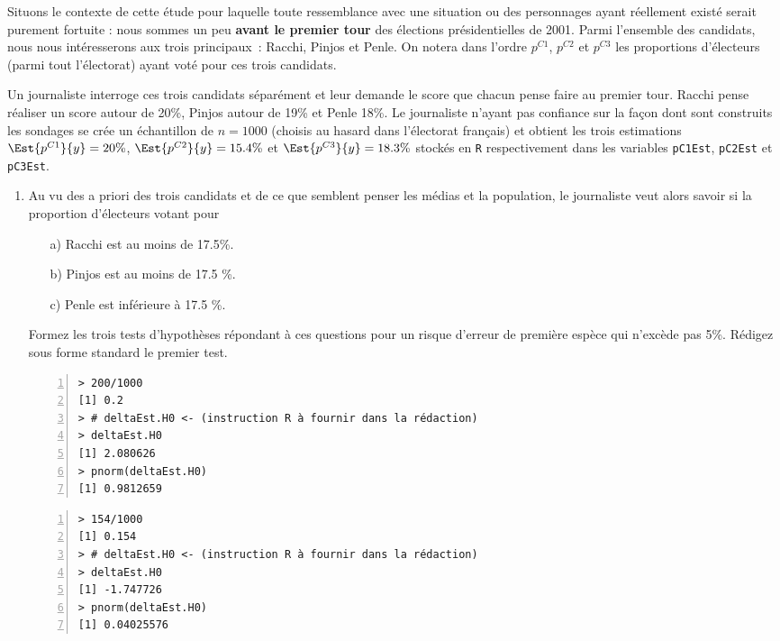 \documentclass[10pt]{report}
\begin{document}
\begin{exercice}

Situons le contexte  de cette étude pour laquelle toute ressemblance avec une situation ou des personnages ayant réellement existé serait purement fortuite : nous sommes un peu \textbf{avant le premier tour} des élections présidentielles de 2001. Parmi l'ensemble des candidats, nous nous intéresserons aux trois principaux~: Racchi, Pinjos et Penle.  On notera dans l'ordre $p^{C1}$, $p^{C2}$ et $p^{C3}$ les proportions d'électeurs (parmi tout l'électorat) ayant voté pour ces trois candidats.

Un journaliste interroge ces trois candidats séparément et leur demande le score que chacun pense faire au premier tour. Racchi pense réaliser un score autour de 20\%, Pinjos autour de 19\% et Penle 18\%.  Le journaliste n'ayant pas confiance sur la façon dont sont construits les sondages se crée un échantillon de $n=1000$ (choisis au hasard dans l'électorat français) et obtient les trois estimations $\Est{p^{C1}}{y}=20\%$, $\Est{p^{C2}}{y}=15.4\%$ et $\Est{p^{C3}}{y}=18.3\%$ stockés en \texttt{R} respectivement dans les variables \texttt{pC1Est}, \texttt{pC2Est} et \texttt{pC3Est}.

\begin{enumerate}
\item Au vu des a priori des trois candidats et de ce que semblent penser les médias et la population,  le journaliste veut alors savoir si la proportion d'électeurs votant pour
\begin{itemize}
\item[a)] Racchi est au moins de 17.5\%.
\item[b)] Pinjos est au moins de 17.5 \%.
\item[c)] Penle est inférieure à 17.5 \%.
\end{itemize} 
Formez les trois tests d'hypothèses répondant à ces questions pour un risque d'erreur de première espèce qui n'excède pas 5\%.  Rédigez sous forme standard le premier test. 

\IndicR
\begin{Verbatim}[frame=leftline,fontfamily=tt,fontshape=n,numbers=left]
> 200/1000
[1] 0.2
> # deltaEst.H0 <- (instruction R à fournir dans la rédaction)
> deltaEst.H0
[1] 2.080626
> pnorm(deltaEst.H0)
[1] 0.9812659
\end{Verbatim}

\begin{Verbatim}[frame=leftline,fontfamily=tt,fontshape=n,numbers=left]
> 154/1000
[1] 0.154
> # deltaEst.H0 <- (instruction R à fournir dans la rédaction)
> deltaEst.H0
[1] -1.747726
> pnorm(deltaEst.H0)
[1] 0.04025576
\end{Verbatim}


\end{enumerate}
\end{exercice}
\end{document}
